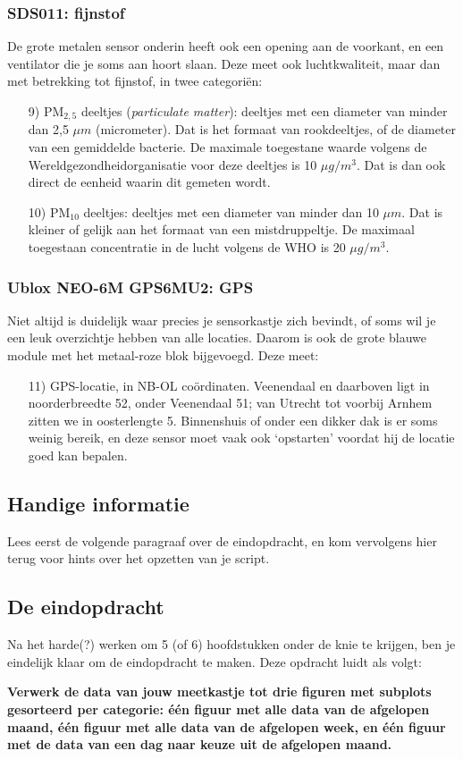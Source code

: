 \documentclass[a4paper,11pt, fleqn]{article}
\begin{document}
\subsubsection{SDS011: fijnstof}
De grote metalen sensor onderin heeft ook een opening aan de voorkant, en een ventilator die je soms aan hoort slaan. Deze meet ook luchtkwaliteit, maar dan met betrekking tot fijnstof, in twee categori\"en:
\begin{itemize}
	\item[9)] PM$_{2,5}$ deeltjes ({\it particulate matter}): deeltjes met een diameter van minder dan 2,5 $\mu m$ (micrometer). Dat is het formaat van rookdeeltjes, of de diameter van een gemiddelde bacterie. De maximale toegestane waarde volgens de Wereldgezondheidorganisatie voor deze deeltjes is 10 $\mu g/m^3$. Dat is dan ook direct de eenheid waarin dit gemeten wordt.
	\item[10)] PM$_{10}$ deeltjes: deeltjes met een diameter van minder dan 10 $\mu m$. Dat is kleiner of gelijk aan het formaat van een mistdruppeltje. De maximaal toegestaan concentratie in de lucht volgens de WHO is 20 $\mu g/m^3$. 
\end{itemize}

\subsubsection{Ublox NEO-6M GPS6MU2: GPS}
Niet altijd is duidelijk waar precies je sensorkastje zich bevindt, of soms wil je een leuk overzichtje hebben van alle locaties. Daarom is ook de grote blauwe module met het metaal-roze blok bijgevoegd. Deze meet:
\begin{itemize}
	\item[11)] GPS-locatie, in NB-OL co\"ordinaten. Veenendaal en daarboven ligt in noorderbreedte 52, onder Veenendaal 51; van Utrecht tot voorbij Arnhem zitten we in oosterlengte 5. Binnenshuis of onder een dikker dak is er soms weinig bereik, en deze sensor moet vaak ook `opstarten' voordat hij de locatie goed kan bepalen.
\end{itemize}

\subsection{Handige informatie}
Lees eerst de volgende paragraaf over de eindopdracht, en kom vervolgens hier terug voor hints over het opzetten van je script.

\subsection{De eindopdracht}
Na het harde(?) werken om 5 (of 6) hoofdstukken onder de knie te krijgen, ben je eindelijk klaar om de eindopdracht te maken. Deze opdracht luidt als volgt: 

{\bf Verwerk de data van jouw meetkastje tot drie figuren met subplots gesorteerd per categorie: \'e\'en figuur met alle data van de afgelopen maand, \'e\'en figuur met alle data van de afgelopen week, en \'e\'en figuur met de data van een dag naar keuze uit de afgelopen maand.}
\end{document}

